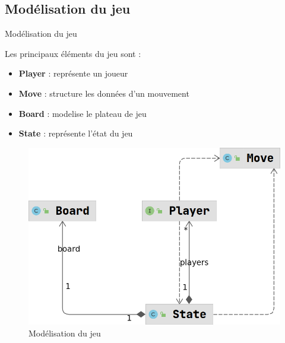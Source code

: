 \subsection*{Modélisation du jeu}
    \begin{frame}{Modélisation du jeu}
        \begin{block}{Les principaux éléments du jeu sont :}
            \begin{itemize}
                \item \textbf{Player} : représente un joueur
                \item \textbf{Move} : structure les données d'un mouvement
                \item \textbf{Board} : modelise le plateau de jeu
                \item \textbf{State} : représente l'état du jeu
            \end{itemize}
        \end{block}
        \begin{figure}
            \begin{center}
                \includegraphics[scale=0.25]{Images/model}
                \caption{Modélisation du jeu}
            \end{center}
        \end{figure}
    \end{frame}

